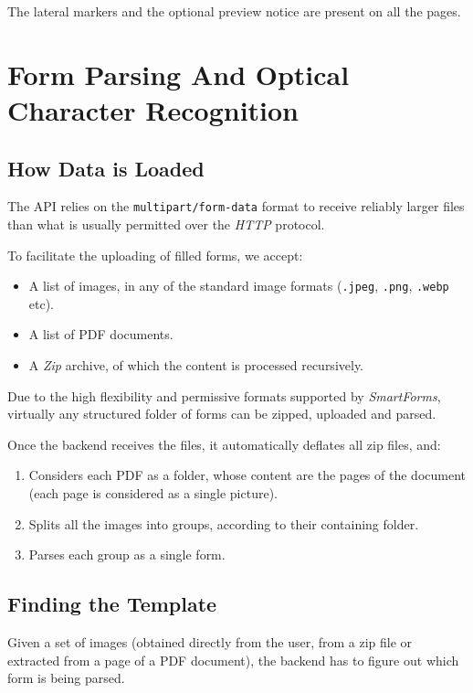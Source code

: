 \documentclass[12pt, a4paper]{report}
\def\code#1{\texttt{#1}}
\begin{document}
The lateral markers and the optional preview notice are present on all the pages.



\chapter{Form Parsing And Optical Character Recognition}

\section{How Data is Loaded}

The API relies on the \code{multipart/form-data}\cite{masinter1998rfc2388} format to receive reliably larger files than what is usually permitted over the \textit{HTTP} protocol.

To facilitate the uploading of filled forms, we accept:
\begin{itemize}
    \item A list of images, in any of the standard image formats (\code{.jpeg}, \code{.png}, \code{.webp} etc).
    \item A list of PDF documents.
    \item A \textit{Zip} archive, of which the content is processed recursively.
\end{itemize}

Due to the high flexibility and permissive formats supported by \textit{SmartForms}, virtually any structured folder of forms can be zipped, uploaded and parsed.

Once the backend receives the files, it automatically deflates all zip files, and:
\begin{enumerate}
    \item Considers each PDF as a folder, whose content are the pages of the document (each page is considered as a single picture).
    \item Splits all the images into groups, according to their containing folder.
    \item Parses each group as a single form.
\end{enumerate}

\section{Finding the Template}

Given a set of images (obtained directly from the user, from a zip file or extracted from a page of a PDF document), the backend has to figure out which form is being parsed.
\end{document}
